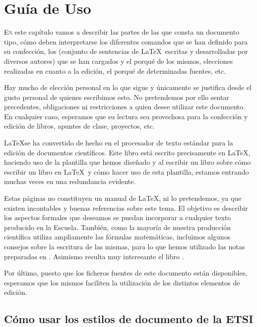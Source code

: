 \chapter{Guía de Uso}\label{chp-01}


\lettrine[lraise=-0.1, lines=2, loversize=0.2]{E}{n} este capítulo vamos a describir las partes de las que consta un documento tipo, cómo deben interpretarse los diferentes comandos que se han definido para su confección, los  (conjunto de sentencias de \LaTeX\ escritas y desarrolladas por diversos autores) que se han cargados y el porqué de los mismos, elecciones realizadas en cuanto a la edición, el porqué de determinadas fuentes, etc. 

Hay mucho de elección personal en lo que sigue y únicamente se justifica desde el gusto personal de quienes escribimos esto. No pretendemos por ello sentar precedentes, obligaciones ni restricciones a quien desee utilizar este documento. En cualquier caso, esperamos que su lectura sea provechosa para la confección y edición de libros, apuntes de clase, proyectos, etc.

\LaTeX se ha convertido de hecho en el procesador de texto estándar para la edición de documentos científicos. Este libro está escrito precisamente en \LaTeX, haciendo uso de la plantilla que hemos diseñado y al escribir un libro sobre cómo escribir un libro en \LaTeX\  y cómo hacer uso de esta plantilla, estamos entrando muchas veces en una redundancia evidente.

Estas páginas no constituyen un manual de \LaTeX,  ni lo pretendemos, ya que existen incontables y buenas referencias sobre este tema. El objetivo es describir los aspectos formales que deseamos se puedan incorporar a cualquier texto producido en la Escuela.  También, como la mayoría de nuestra producción científica utiliza ampliamente las fórmulas matemáticas, incluimos algunos consejos sobre la escritura de las mismas, para lo que hemos utilizado las notas preparadas en \cite{moser}. Asimismo resulta muy interesante el libro \cite{gratzer}.

Por último, puesto que los ficheros fuentes de este documento están disponibles, esperamos que los mismos faciliten la utilización de los distintos elementos de edición.

\section{Cómo usar los  estilos de documento de la ETSI}\label{sec-00}


